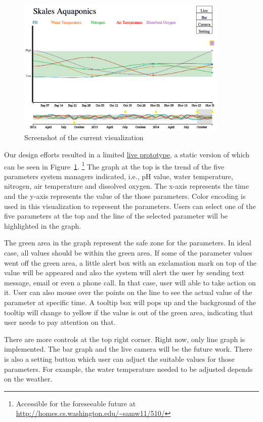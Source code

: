 \documentclass{sigchi}
\begin{document}
\begin{figure}
\centering
\includegraphics[width=0.9\textwidth]{Visualization_Screenshot}
\caption{Screenshot of the current visualization}
\label{fig:visualization}
\end{figure}

Our design efforts resulted in a limited \href{http://homes.cs.washington.edu/~samw11/510/}{live prototype}, a static version of which can be seen in Figure~\ref{fig:visualization}. 
\footnote{Accessible for the foreseeable future at \url{http://homes.cs.washington.edu/~samw11/510/}} The graph at the top is the trend of the five parameters system managers indicated, i.e., pH value, water temperature, nitrogen, air temperature and dissolved oxygen. The x-axis represents the time and the y-axis represents the value of the those parameters. Color encoding is used in this visualization to represent the parameters. Users can select one of the five parameters at the top and the line of the selected parameter will be highlighted in the graph. 

The green area in the graph represent the safe zone for the parameters. In ideal case, all values should be within the green area. If some of the parameter values went off the green area, a little alert box with an exclamation mark on top of the value will be appeared and also the system will alert the user by sending text message, email or even a phone call. In that case, user will able to take action on it. User can also mouse over the points on the line to see the actual value of the parameter at specific time. A tooltip box will pops up and the background of the tooltip will change to yellow if the value is out of the green area, indicating that user needs to pay attention on that.

There are more controls at the top right corner. Right now, only line graph is implemented. The bar graph and the live camera will be the future work. There is also a setting button which user can adjuct the suitable values for those parameters. For example, the water temperature needed to be adjusted depends on the weather. 
\end{document}
